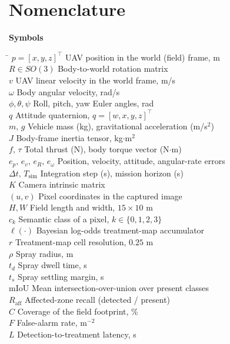 \documentclass[12pt,a4paper]{article}
\begin{document}
\clearpage

\section*{Nomenclature}

\noindent\textbf{Symbols}
\begin{tabbing}
\hspace{3.2cm}\=\hspace{10cm}\kill
$p=[x,y,z]^{\top}$   \> UAV position in the world (field) frame, m \\
$R\in SO(3)$         \> Body-to-world rotation matrix \\
$v$                  \> UAV linear velocity in the world frame, m/s \\
$\omega$             \> Body angular velocity, rad/s \\
$\phi,\theta,\psi$   \> Roll, pitch, yaw Euler angles, rad \\
$q$                  \> Attitude quaternion, $q=[w,x,y,z]^{\top}$ \\
$m,\,g$              \> Vehicle mass (kg), gravitational acceleration (m/s$^2$) \\
$J$                  \> Body-frame inertia tensor, kg$\cdot$m$^2$ \\
$f,\,\tau$           \> Total thrust (N), body torque vector (N$\cdot$m) \\
$e_p,\,e_v,\,e_R,\,e_\omega$ \> Position, velocity, attitude, angular-rate errors \\
$\Delta t,\,T_{\mathrm{sim}}$ \> Integration step (s), mission horizon (s) \\
$K$                  \> Camera intrinsic matrix \\
$(u,v)$              \> Pixel coordinates in the captured image \\
$H,W$                \> Field length and width, $15\times10$ m \\
$c_{k}$              \> Semantic class of a pixel, $k\in\{0,1,2,3\}$ \\
$\ell(\cdot)$        \> Bayesian log-odds treatment-map accumulator \\
$r$                  \> Treatment-map cell resolution, $0.25$ m \\
$\rho$               \> Spray radius, m \\
$t_{d}$              \> Spray dwell time, s \\
$t_{s}$              \> Spray settling margin, s \\
$\mathrm{mIoU}$      \> Mean intersection-over-union over present classes \\
$R_{\mathrm{aff}}$   \> Affected-zone recall (detected / present) \\
$C$                  \> Coverage of the field footprint, \% \\
$F$                  \> False-alarm rate, m$^{-2}$ \\
$L$                  \> Detection-to-treatment latency, s \\
\end{tabbing}
\end{document}

